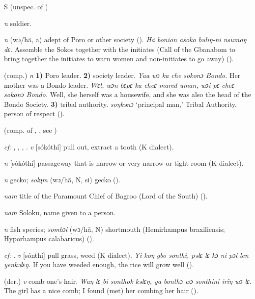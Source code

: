 \begin{letter}{S}
 (unspec. of ) 

 \textit{n} soldier.

 \textit{n} (wɔ/hã, a) adept of Poro or other society (\citealt{Pichl1967}). \textit{Hã bonion asoko buliŋ-ni nsumoŋ dɛ.} Assemble the Sokos together with the initiates (Call of the Gbanabom to bring together the initiates to warn women and non-initiates to go away) (\citealt{Pichl1967}). 

 (comp.) \textit{n} \textbf{1)} Poro leader. \textbf{2)} society leader. \textit{Yaa wɔ ka che sokonɔ Bondo.} Her mother was a Bondo leader. \textit{Wɛl, wɔn bɛpɛ ka cheɛ mared uman, wɔi pɛ cheɛ sokonɔ Bondo.} Well, she herself was a housewife, and she was also the head of the Bondo Society. \textbf{3)} tribal authority. \textit{soŋkənɔ} ‘principal man,' Tribal Authority, person of respect (\citealt{Hall1938}). 

 (comp. of , , see )

 \textit{cf}: , , , . \textit{v} [sókóthí] pull out, extract a tooth (K dialect). 

 \textit{n} [sókóthí] passageway that is narrow or very narrow or tight room (K dialect).

 \textit{n} gecko; \textit{solo̹m} (wɔ/hã, N, si) gecko (\citealt{Pichl1967}). 

 \textit{nam} title of the Paramount Chief of Bagroo (Lord of the South) (\citealt{Pichl1967}). 

 \textit{nam} Soloku, name given to a person. 

 \textit{n} fish species; \textit{sombɔl} (wɔ/hã, N) shortmouth (Hemirhampus braxiliensis; Hyporhampus calabaricus) (\citealt{Pichl1967}).

 \textit{cf}: . \textit{v} [sónthí] pull grass, weed (K dialect). \textit{Yi koŋ gbo sonthi, pəlɛ lɛ kɔ ni pɔl len yenkəlɛŋ.} If you have weeded enough, the rice will grow well (\citealt{Pichl1967}). 

 (der.) \textit{v} comb one's hair. \textit{Waŋ lɛ bi sonthok kəlɛŋ, ya bonthɔ wɔ sonthini irĩŋ wɔ lɛ.} The girl has a nice comb; I found (met) her combing her hair (\citealt{Pichl1967}). 


\end{letter}

